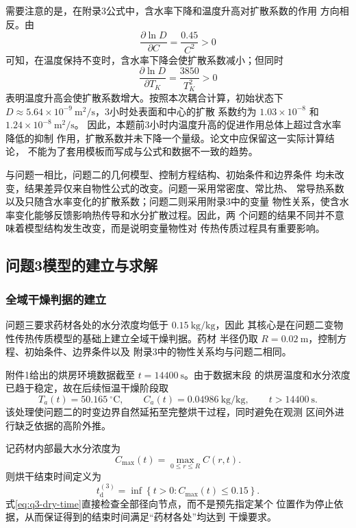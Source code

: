 \documentclass[12pt,a4paper]{article}
\renewcommand{\boxed}[1]{#1}
\begin{document}
\begin{center}
需要注意的是，在附录3公式中，含水率下降和温度升高对扩散系数的作用
方向相反。由
\begin{equation}
\frac{\partial\ln D}{\partial C}
=
\frac{0.45}{C^2}>0
\end{equation}
可知，在温度保持不变时，含水率下降会使扩散系数减小；但同时
\begin{equation}
\frac{\partial\ln D}{\partial T_K}
=
\frac{3850}{T_K^2}>0
\end{equation}
表明温度升高会使扩散系数增大。按照本次耦合计算，初始状态下
$D\approx5.64\times10^{-9}\ \mathrm{m^2/s}$，3小时处表面和中心的扩散
系数约为 $1.03\times10^{-8}$ 和 $1.24\times10^{-8}\ \mathrm{m^2/s}$。
因此，本题前3小时内温度升高的促进作用总体上超过含水率降低的抑制
作用，扩散系数并未下降一个量级。论文中应保留这一实际计算结论，
不能为了套用模板而写成与公式和数据不一致的趋势。

与问题一相比，问题二的几何模型、控制方程结构、初始条件和边界条件
均未改变，结果差异仅来自物性公式的改变。问题一采用常密度、常比热、
常导热系数以及只随含水率变化的扩散系数；问题二则采用附录3中的变量
物性关系，使含水率变化能够反馈影响热传导和水分扩散过程。因此，两
个问题的结果不同并不意味着模型结构发生改变，而是说明变量物性对
传热传质过程具有重要影响。
\subsection{问题3模型的建立与求解}

\subsubsection{全域干燥判据的建立}

问题三要求药材各处的水分浓度均低于 $0.15\ \mathrm{kg/kg}$，因此
其核心是在问题二变物性传热传质模型的基础上建立全域干燥判据。药材
半径仍取 $R=0.02\ \mathrm{m}$，控制方程、初始条件、边界条件以及
附录3中的物性关系均与问题二相同。

附件1给出的烘房环境数据截至 $t=14400\ \mathrm{s}$。由于数据末段
的烘房温度和水分浓度已趋于稳定，故在后续恒温干燥阶段取
\begin{equation}
T_a(t)=50.165\ ^\circ\mathrm{C},\qquad
C_a(t)=0.04986\ \mathrm{kg/kg},\qquad t>14400\ \mathrm{s}.
\label{eq:q3-environment-extension}
\end{equation}
该处理使问题二的时变边界自然延拓至完整烘干过程，同时避免在观测
区间外进行缺乏依据的高阶外推。

记药材内部最大水分浓度为
\begin{equation}
C_{\max}(t)=\max_{0\leq r\leq R}C(r,t).
\label{eq:q3-cmax}
\end{equation}
则烘干结束时间定义为
\begin{equation}
\boxed{
t_{\mathrm d}^{(3)}
=\inf\left\{t>0:C_{\max}(t)\leq0.15\right\}
}.
\label{eq:q3-dry-time}
\end{equation}
式\eqref{eq:q3-dry-time}直接检查全部径向节点，而不是预先指定某个
位置作为停止依据，从而保证得到的结束时间满足“药材各处”均达到
干燥要求。


\end{center}
\end{document}
